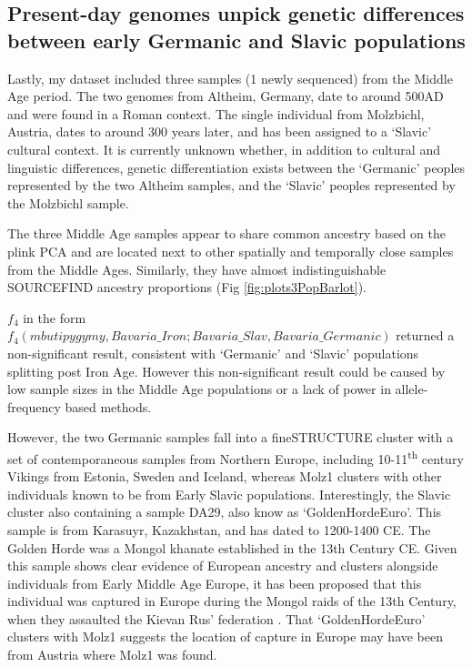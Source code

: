 \subsection{Present-day genomes unpick genetic differences between early Germanic and Slavic populations}

Lastly, my dataset included three samples (1 newly sequenced) from the Middle Age period. The two genomes from Altheim, Germany, date to around 500AD and were found in a Roman context. The single individual from Molzbichl, Austria, dates to around 300 years later, and has been assigned to a `Slavic' cultural context. It is currently unknown whether, in addition to cultural and linguistic differences, genetic differentiation exists between the `Germanic’ peoples represented by the two Altheim samples, and the `Slavic’ peoples represented by the Molzbichl sample.

The three Middle Age samples appear to share common ancestry based on the plink PCA and are located next to other spatially and temporally close samples from the Middle Ages. Similarly, they have almost indistinguishable SOURCEFIND ancestry proportions (Fig \ref{fig:plots3PopBarlot}).

$f_{4}$ in the form $f_{4}(mbutipygymy, Bavaria\_Iron; Bavaria\_Slav, Bavaria\_Germanic)$ returned a non-significant result, consistent with `Germanic' and `Slavic' populations splitting post Iron Age. However this non-significant result could be caused by low sample sizes in the Middle Age populations or a lack of power in allele-frequency based methods.

However, the two Germanic samples fall into a fineSTRUCTURE cluster with a set of contemporaneous samples from Northern Europe, including 10-11\textsuperscript{th} century Vikings from Estonia, Sweden and Iceland, whereas Molz1 clusters with other individuals known to be from Early Slavic populations. Interestingly, the Slavic cluster also containing a sample DA29, also know as `GoldenHordeEuro'. This sample is from Karasuyr, Kazakhstan, and has dated to 1200-1400 CE. The Golden Horde was a Mongol khanate established in the 13th Century CE. Given this sample shows clear evidence of European ancestry and clusters alongside individuals from Early Middle Age Europe, it has been proposed that this individual was captured in Europe during the Mongol raids of the 13th Century, when they assaulted the Kievan Rus' federation \cite{de2018137}. That `GoldenHordeEuro' clusters with Molz1 suggests the location of capture in Europe may have been from Austria where Molz1 was found.

